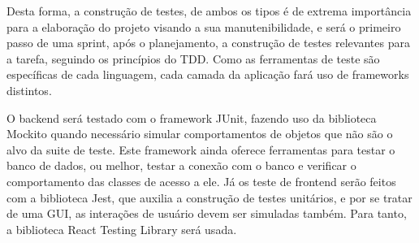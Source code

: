 Desta forma, a construção de testes, de ambos os tipos é de extrema
importância para a elaboração do projeto visando a sua
manutenibilidade, e será o primeiro passo de uma sprint, após o
planejamento, a construção de testes relevantes para a tarefa,
seguindo os princípios do TDD\cite{TDD}. Como as ferramentas de teste são
específicas de cada linguagem, cada camada da aplicação fará uso de
frameworks distintos.

O \gls{backend} será testado com o framework JUnit, fazendo uso da
biblioteca Mockito quando necessário simular comportamentos de objetos
que não são o alvo da suite de teste. Este framework ainda oferece
ferramentas para testar o banco de dados, ou melhor, testar a conexão
com o banco e verificar o comportamento das classes de acesso a ele.
Já os teste de \gls{frontend} serão feitos com a biblioteca Jest,
que auxilia a construção de testes unitários, e por se tratar de uma
\gls{GUI}, as interações de usuário devem ser simuladas também. Para tanto, a
biblioteca React Testing Library será usada.


